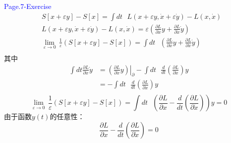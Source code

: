 \documentclass[12pt, a4paper, oneside]{ctexart}
\begin{document}
\textcolor{blue}{Page.7-Exercise}
\[\begin{aligned}
         & S\left[ x+\varepsilon y \right]-S\left[ x \right]=\int{dt\text{ }L\left( x+\varepsilon y,\dot{x}+\varepsilon \dot{y} \right)-L\left( x,\dot{x} \right)}                                                                                       \\
         & L\left( x+\varepsilon y,\dot{x}+\varepsilon \dot{y} \right)-L\left( x,\dot{x} \right)=\varepsilon \left( \frac{\partial L}{\partial x}y+\frac{\partial L}{\partial \dot{x}}\dot{y} \right)                                                    \\
         & \underset{\varepsilon \to 0}{\mathop{\lim }}\,\frac{1}{\varepsilon }\left( S\left[ x+\varepsilon y \right]-S\left[ x \right] \right)=\int{dt\text{ }\left( \frac{\partial L}{\partial x}y+\frac{\partial L}{\partial \dot{x}}\dot{y} \right)} \\
    \end{aligned}\]
其中
\[\begin{aligned}
        \int{dt\frac{\partial L}{\partial \dot{x}}\dot{y}} & ={{\left. \left( \frac{\partial L}{\partial \dot{x}}y \right) \right|}_{\partial }}-\int{dt\text{ }\frac{d}{dt}\left( \frac{\partial L}{\partial \dot{x}} \right)y} \\
                                                           & =-\int{dt\text{ }\frac{d}{dt}\left( \frac{\partial L}{\partial \dot{x}} \right)y}                                                                                   \\
    \end{aligned}\]
\[\underset{\varepsilon \to 0}{\mathop{\lim }}\,\frac{1}{\varepsilon }\left( S\left[ x+\varepsilon y \right]-S\left[ x \right] \right)=\int{dt\text{ }\left( \frac{\partial L}{\partial x}-\frac{d}{dt}\left( \frac{\partial L}{\partial \dot{x}} \right) \right)y}=0\]
由于函数$y\left(t\right)$的任意性：
\[\frac{\partial L}{\partial x}-\frac{d}{dt}\left( \frac{\partial L}{\partial \dot{x}} \right)=0\]
\end{document}
